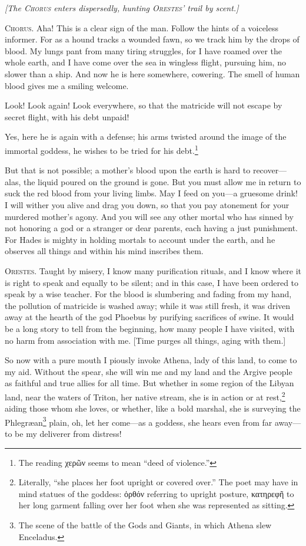 \documentclass[12pt]{article}
\begin{document}
\begin{center}
\textit{[The \textsc{Chorus} enters dispersedly, hunting \textsc{Orestes'} trail by scent.]}
\end{center}

\textsc{Chorus.} Aha! This is a clear sign of the man. Follow the hints of a voiceless informer. For as a hound tracks a wounded fawn, so we track him by the drops of blood. My lungs pant from many tiring struggles, for I have roamed over the whole earth, and I have come over the sea in wingless flight, pursuing him, no slower than a ship. And now he is here somewhere, cowering. The smell of human blood gives me a smiling welcome.

Look! Look again! Look everywhere, so that the matricide will not escape by secret flight, with his debt unpaid!

Yes, here he is again with a defense; his arms twisted around the image of the immortal goddess, he wishes to be tried for his debt.\footnote{The reading χερῶν seems to mean ``deed of violence.''}

But that is not possible; a mother's blood upon the earth is hard to recover---alas, the liquid poured on the ground is gone. But you must allow me in return to suck the red blood from your living limbs. May I feed on you---a gruesome drink! I will wither you alive and drag you down, so that you pay atonement for your murdered mother's agony. And you will see any other mortal who has sinned by not honoring a god or a stranger or dear parents, each having a just punishment. For Hades is mighty in holding mortals to account under the earth, and he observes all things and within his mind inscribes them.

\textsc{Orestes.} Taught by misery, I know many purification rituals, and I know where it is right to speak and equally to be silent; and in this case, I have been ordered to speak by a wise teacher. For the blood is slumbering and fading from my hand, the pollution of matricide is washed away; while it was still fresh, it was driven away at the hearth of the god Phoebus by purifying sacrifices of swine. It would be a long story to tell from the beginning, how many people I have visited, with no harm from association with me. [Time purges all things, aging with them.]

So now with a pure mouth I piously invoke Athena, lady of this land, to come to my aid. Without the spear, she will win me and my land and the Argive people as faithful and true allies for all time. But whether in some region of the Libyan land, near the waters of Triton, her native stream, she is in action or at rest,\footnote{Literally, ``she places her foot upright or covered over.'' The poet may have in mind statues of the goddess: ὀρθόν referring to upright posture, κατηρεφῆ to her long garment falling over her foot when she was represented as sitting.} aiding those whom she loves, or whether, like a bold marshal, she is surveying the Phlegr{\ae}an\footnote{The scene of the battle of the Gods and Giants, in which Athena slew Enceladus.} plain, oh, let her come---as a goddess, she hears even from far away---to be my deliverer from distress!
\end{document}
